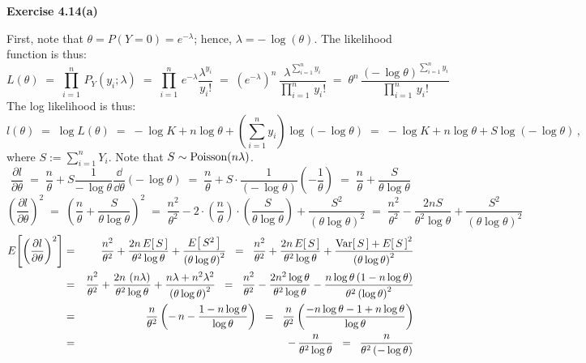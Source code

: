 
\noindent
\textbf{Exercise 4.14(a)}

\vskip 0.3cm
\noindent
First, note that $\theta = P(Y = 0) = e^{-\lambda}$; hence, $\lambda = -\,\log(\theta)$.
The likelihood function is thus:
\begin{equation*}
L(\theta)
\;=\; \prod_{i=1}^{n}\,P_{Y}(y_{i};\lambda)
\;=\; \prod_{i=1}^{n}\,e^{-\lambda}\dfrac{\lambda^{y_{i}}}{y_{i}!}
\;=\; \left(e^{-\lambda}\right)^{n}\,\dfrac{\lambda^{\sum_{i=1}^{n}y_{i}}}{\prod_{i=1}^{n}\,y_{i}!}
\;=\; \theta^{n}\,\dfrac{\left(-\,\log\theta\right)^{\sum_{i=1}^{n}y_{i}}}{\prod_{i=1}^{n}\,y_{i}!}
\end{equation*}
The log likelihood is thus:
\begin{equation*}
l(\theta)
\;=\; \log L(\theta)
\;=\; - \log K + n\log\theta + \left(\sum_{i=1}^{n}y_{i}\right)\log\!\left(-\,\log\theta\right)
\;=\; - \log K + n\log\theta + S\log\!\left(-\,\log\theta\right)\,,
\end{equation*}
where $S := \sum_{i=1}^{n}Y_{i}$.
Note that $S \sim \textnormal{Poisson}(n\lambda)$.
\begin{equation*}
\dfrac{\partial l}{\partial\theta}
\;=\; \dfrac{n}{\theta} + S\dfrac{1}{-\,\log\theta}\dfrac{\dd}{\dd\theta}\!\left(-\,\log\theta\right)
\;=\; \dfrac{n}{\theta} + S\cdot\dfrac{1}{\left(-\,\log\theta\right)}\left(-\dfrac{1}{\theta}\right)
\;=\; \dfrac{n}{\theta} + \dfrac{S}{\theta\log\theta}
\end{equation*}
\begin{equation*}
\left(\dfrac{\partial l}{\partial\theta}\right)^{2}
\;=\; \left(\dfrac{n}{\theta} + \dfrac{S}{\theta\log\theta}\right)^{2}
\;=\; \dfrac{n^{2}}{\theta^{2}} - 2\cdot\left(\dfrac{n}{\theta}\right)\cdot\left(\dfrac{S}{\theta\log\theta}\right) + \dfrac{S^{2}}{\left(\theta\log\theta\right)^{2}}
\;=\; \dfrac{n^{2}}{\theta^{2}} - \dfrac{2nS}{\theta^{2}\log\theta} + \dfrac{S^{2}}{\left(\theta\log\theta\right)^{2}}
\end{equation*}
\begin{eqnarray*}
E\!\left[\left(\dfrac{\partial l}{\partial\theta}\right)^{2}\right]
&=& \dfrac{n^{2}}{\theta^{2}} + \dfrac{2n\,E\!\left[\,S\,\right]}{\theta^{2}\log\theta} + \dfrac{E\!\left[\,S^{2}\,\right]}{\left(\theta\log\theta\right)^{2}}
\;\;=\;\; \dfrac{n^{2}}{\theta^{2}} + \dfrac{2n\,E\!\left[\,S\,\right]}{\theta^{2}\log\theta} + \dfrac{\textnormal{Var}\!\left[\,S\,\right] + E\!\left[\,S\,\right]^{2}}{\left(\theta\log\theta\right)^{2}}
\\
&=& \dfrac{n^{2}}{\theta^{2}} + \dfrac{2n\,\left(n\lambda\right)}{\theta^{2}\log\theta} + \dfrac{n\lambda + n^{2}\lambda^{2}}{\left(\theta\log\theta\right)^{2}}
\;\;=\;\; \dfrac{n^{2}}{\theta^{2}} - \dfrac{2n^{2}\log\theta}{\theta^{2}\log\theta} - \dfrac{n\log\theta\left(1 - n\log\theta\right)}{\theta^{2}\left(\log\theta\right)^{2}}
\\
&=& \dfrac{n}{\theta^{2}}\left(-\,n-\dfrac{1-n\log\theta}{\log\theta}\right)
\;\;=\;\; \dfrac{n}{\theta^{2}}\left(\dfrac{-n\log\theta-1+n\log\theta}{\log\theta}\right)
\\
&=& -\,\dfrac{n}{\theta^{2}\log\theta}
\;\;=\;\; \dfrac{n}{\theta^{2}\left(-\log\theta\right)}
\end{eqnarray*}
